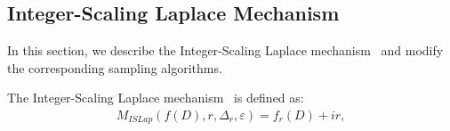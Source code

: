 


\subsection{Integer-Scaling Laplace Mechanism}
\label{subsec:ISLap}
In this section, we describe the Integer-Scaling Laplace mechanism~\cite{googleDP2019} and modify the corresponding sampling algorithms.

The Integer-Scaling Laplace mechanism~\cite{googleDP2019} is defined as:
\begin{equation}
    \begin{split}
        M_{ISLap}\left(f\left(D\right),r,\Delta _r,\varepsilon\right)=f_r\left(D\right) +ir,
    \end{split}
\end{equation}

